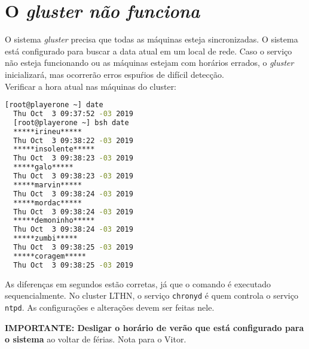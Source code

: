 \chapter{O \textit{gluster não funciona}}

O sistema \textit{gluster} precisa que todas as máquinas esteja sincronizadas. O sistema está configurado para buscar
a data atual em um local de rede. Caso o serviço não esteja funcionando ou as máquinas estejam com horários errados, o \textit{gluster} inicializará, mas ocorrerão erros espuŕios de difícil detecção.\\

Verificar a hora atual nas máquinas do cluster:

\begin{lstlisting}[language=bash,basicstyle=\small]
  [root@playerone ~] date
  Thu Oct  3 09:37:52 -03 2019
  [root@playerone ~] bsh date
  *****irineu*****
  Thu Oct  3 09:38:22 -03 2019
  *****insolente*****
  Thu Oct  3 09:38:23 -03 2019
  *****galo*****
  Thu Oct  3 09:38:23 -03 2019
  *****marvin*****
  Thu Oct  3 09:38:24 -03 2019
  *****mordac*****
  Thu Oct  3 09:38:24 -03 2019
  *****demoninho*****
  Thu Oct  3 09:38:24 -03 2019
  *****zumbi*****
  Thu Oct  3 09:38:25 -03 2019
  *****coragem*****
  Thu Oct  3 09:38:25 -03 2019
\end{lstlisting}

As diferenças em segundos estão corretas, já que o comando é executado sequencialmente.
No cluster LTHN, o serviço \texttt{chronyd} é quem controla o serviço \texttt{ntpd}. As configurações
e alterações devem ser feitas nele.

\textbf{IMPORTANTE: Desligar o horário de verão que está configurado para o sistema} ao voltar de férias. Nota para o Vitor.
